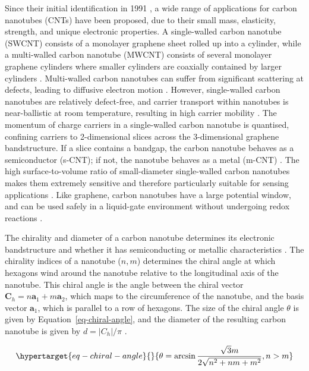 \documentclass[
  a4paper,
]{scrbook}
\begin{document}
Since their initial identification in 1991 \autocite{Iijima1991}, a wide
range of applications for carbon nanotubes (CNTs) have been proposed,
due to their small mass, elasticity, strength, and unique electronic
properties. A single-walled carbon nanotube (SWCNT) consists of a
monolayer graphene sheet rolled up into a cylinder, while a multi-walled
carbon nanotube (MWCNT) consists of several monolayer graphene cylinders
where smaller cylinders are coaxially contained by larger cylinders
\autocite{Dekker1999,Avouris2007,Cao2009,Rouhi2010,Shkodra2021}.
Multi-walled carbon nanotubes can suffer from significant scattering at
defects, leading to diffusive electron motion \autocite{Dekker1999}.
However, single-walled carbon nanotubes are relatively defect-free, and
carrier transport within nanotubes is near-ballistic at room
temperature, resulting in high carrier mobility
\autocite{Dekker1999,Avouris2007,Cao2009,Rouhi2010,Shkodra2021}. The
momentum of charge carriers in a single-walled carbon nanotube is
quantised, confining carriers to 2-dimensional slices across the
3-dimensional graphene bandstructure. If a slice contains a bandgap, the
carbon nanotube behaves as a semiconductor (s-CNT); if not, the nanotube
behaves as a metal (m-CNT) \autocite{McEuen2002}. The high
surface-to-volume ratio of small-diameter single-walled carbon nanotubes
makes them extremely sensitive and therefore particularly suitable for
sensing applications \autocite{Cao2009,Yao2021,Shkodra2021}. Like
graphene, carbon nanotubes have a large potential window, and can be
used safely in a liquid-gate environment without undergoing redox
reactions \autocite{Ohno2015}.

The chirality and diameter of a carbon nanotube determines its
electronic bandstructure and whether it has semiconducting or metallic
characteristics
\autocite{Martel1998,Dekker1999,McEuen2002,Avouris2007,Shkodra2021,Li2023}.
The chirality indices of a nanotube (\(n, m\)) determines the chiral
angle at which hexagons wind around the nanotube relative to the
longitudinal axis of the nanotube. This chiral angle is the angle
between the chiral vector
\(\textbf{C}_h = n\textbf{a}_1+m\textbf{a}_2\), which maps to the
circumference of the nanotube, and the basis vector \(\textbf{a}_1\),
which is parallel to a row of hexagons. The size of the chiral angle
\(\theta\) is given by Equation~\ref{eq-chiral-angle}, and the diameter
of the resulting carbon nanotube is given by \(d=|C_h|/\pi\)
\autocite{Lu2012}.

\begin{equation}\protect\hypertarget{eq-chiral-angle}{}{
\theta = \arcsin\frac{\sqrt{3}m}{2\sqrt{n^2+nm+m^2}}, \space n > m
}\label{eq-chiral-angle}\end{equation}
\end{document}
